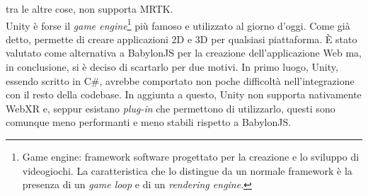     tra le altre cose, non supporta MRTK.\\
    Unity è forse il \textit{game engine}\footnote{
        Game engine: framework software progettato per la creazione e lo sviluppo di videogiochi. La caratteristica che lo distingue da un normale framework è la presenza di un
        \textit{game loop} e di un \textit{rendering engine}.
        } più famoso e utilizzato al giorno d'oggi. Come già detto, permette di creare applicazioni 2D e 3D per qualsiasi piattaforma. È stato valutato come
        alternativa a BabylonJS per la creazione dell'applicazione Web ma, in conclusione, si è deciso di scartarlo per due motivi. In primo luogo, Unity, essendo scritto in C\#, avrebbe
comportato non poche difficoltà nell'integrazione con il resto della codebase. In aggiunta a questo, Unity non supporta nativamente WebXR e, seppur esistano \textit{plug-in} che permettono
di utilizzarlo, questi sono comunque meno performanti e meno stabili rispetto a BabylonJS.\\

